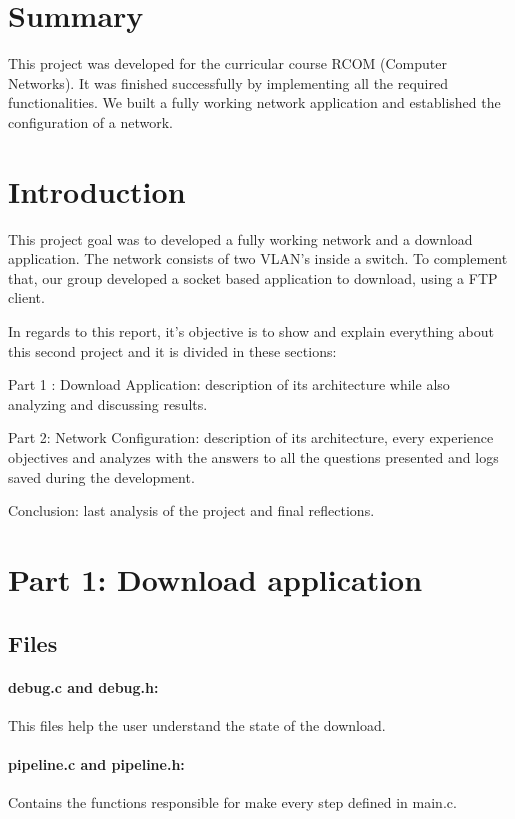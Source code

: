 \documentclass[compilation.tex]{subfiles}
\begin{document}
	
	\section{Summary}
	\label{sec:summary}
	This project was developed for the curricular course RCOM (Computer Networks). It was finished successfully by implementing all the required functionalities. We built a fully working network application and established the configuration of a network.
	
	\section{Introduction}
	\label{sec:introduction}

This project goal was to developed a fully working network and a download application. The network consists of two VLAN’s inside a switch. To complement that, our group developed a socket based application to download, using a FTP client.

In regards to this report, it’s objective is to show and explain everything about this second project and it is divided in these sections:

Part 1 : Download Application: description of its architecture while also analyzing and discussing results.

Part 2: Network Configuration: description of its architecture, every experience objectives and analyzes with the answers to all the questions presented and logs saved during the development.

Conclusion: last analysis of the project and final reflections.
	
	\section{Part 1: Download application}
	\label{sec:downloadapp}
	\subsection{Files}
	\label{subsec:filesproject}
	
	\paragraph{debug.c and debug.h:}
	This files help the user understand the state of the download. 
	
	\paragraph{pipeline.c and pipeline.h:}
	Contains the functions responsible for make every step defined in main.c. 
\end{document}
